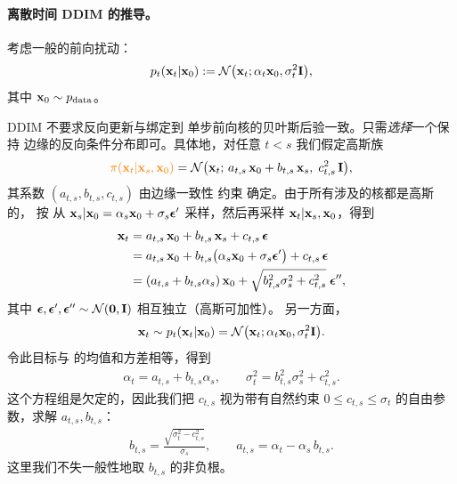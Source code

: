 \paragraph{离散时间 DDIM 的推导。}
考虑一般的前向扰动：
\begin{equation*}
    p_t({\mathbf{x}}_t|{\mathbf{x}}_0) := \mathcal{N}\big({\mathbf{x}}_t; \alpha_t {\mathbf{x}}_0, \sigma_t^2 \mathbf{I}\big),
\end{equation*}
其中 ${\mathbf{x}}_0 \sim p_{\mathrm{data}}$。


DDIM 不要求反向更新与绑定到
单步前向核的贝叶斯后验一致。只需\emph{选择}一个保持
边缘的反向条件分布即可。具体地，对任意 $t<s$ 我们假定高斯族
\begin{align}\label{eq:ddim-reverse-kernel-param}
{\color{orange}\pi({\mathbf{x}}_t|{\mathbf{x}}_s,{\mathbf{x}}_0)}
= \mathcal{N} \big({\mathbf{x}}_t;\, a_{t,s}\,{\mathbf{x}}_0 + b_{t,s}\,{\mathbf{x}}_s,\; c_{t,s}^2\,\mathbf{I}\big),
\end{align}
其系数 $(a_{t,s},b_{t,s},c_{t,s})$ 由边缘一致性
约束  确定。由于所有涉及的核都是高斯的，
按  从 ${\mathbf{x}}_s|{\mathbf{x}}_0=\alpha_s{\mathbf{x}}_0+\sigma_s{\bm{\epsilon}}'$ 采样，然后再采样
${\mathbf{x}}_t|{\mathbf{x}}_s,{\mathbf{x}}_0$，得到
\begin{align}\label{eq:ddim-derivation} 
\begin{aligned}
{\mathbf{x}}_t
&= a_{t,s}\,{\mathbf{x}}_0 + b_{t,s}\,{\mathbf{x}}_s + c_{t,s}\,{\bm{\epsilon}}
\\&= a_{t,s}\,{\mathbf{x}}_0 + b_{t,s}\big(\alpha_s{\mathbf{x}}_0+\sigma_s{\bm{\epsilon}}'\big) + c_{t,s}\,{\bm{\epsilon}} \\
&= (a_{t,s} + b_{t,s}\alpha_s)\,{\mathbf{x}}_0
+ \sqrt{b_{t,s}^2\sigma_s^2 + c_{t,s}^2}\;{\bm{\epsilon}}'',
\end{aligned}
\end{align}
其中 ${\bm{\epsilon}},{\bm{\epsilon}}',{\bm{\epsilon}}''\sim\mathcal{N}(\mathbf{0},\mathbf{I})$ 相互独立（高斯可加性）。
另一方面，
\[
{\mathbf{x}}_t\sim p_t({\mathbf{x}}_t|{\mathbf{x}}_0)
= \mathcal{N} \big({\mathbf{x}}_t; \alpha_t{\mathbf{x}}_0, \sigma_t^2\mathbf{I}\big).
\]
令此目标与  的均值和方差相等，得到
\begin{align*}
\alpha_t = a_{t,s} + b_{t,s}\alpha_s,
\qquad
\sigma_t^2 = b_{t,s}^2\sigma_s^2 + c_{t,s}^2.
\end{align*}
这个方程组是欠定的，因此我们把 $c_{t,s}$ 视为带有自然约束
$0\le c_{t,s} \le \sigma_t$ 的自由参数，求解 $a_{t,s},b_{t,s}$：
\begin{align}\label{eq:ddim-coefficients}
b_{t,s} = \frac{\sqrt{\sigma_t^2 - c_{t,s}^2}}{\sigma_s},
\qquad
a_{t,s} = \alpha_t - \alpha_s\,b_{t,s}.
\end{align}
这里我们不失一般性地取 $b_{t,s}$ 的非负根。

